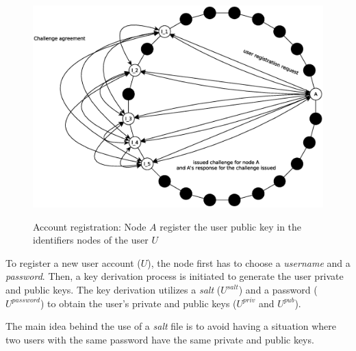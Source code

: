 \begin{figure}[!htb]
\centering
\includegraphics[width=14cm]{../img/sign_up}\\
\caption{Account registration: Node $A$ register the user public key in the
identifiers nodes of the user $U$}
\label{fig:sign_up}
\end{figure}

To register a new user account ($U$), the node first
has to choose a \textit{username} and a \textit{password}.
Then, a key derivation process is initiated to generate the user private and
public keys. The key derivation utilizes a \textit{salt} ($U^{salt}$) and a password ($U^{password}$) to
obtain the user's private and public keys ($U^{priv}$ and $U^{pub}$).
% 
% 

The main idea behind the use of a \textit{salt} file is to avoid having a
situation where two users with the same password have the same private and
public keys.

